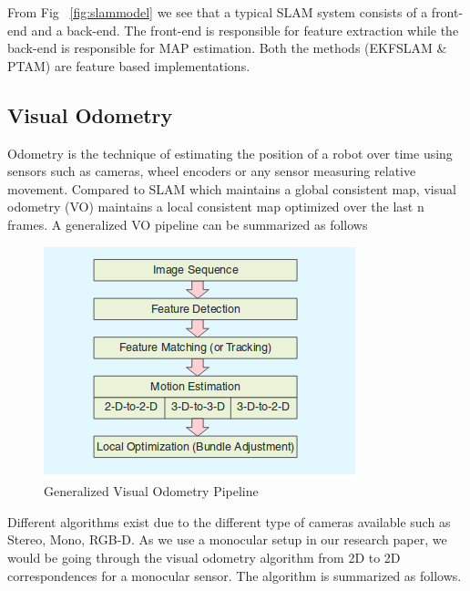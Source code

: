 From Fig ~\ref{fig:slammodel} we see that a typical SLAM system consists of a front-end and a back-end. The front-end is responsible for feature extraction while the back-end is responsible for MAP estimation. Both the methods (EKFSLAM \& PTAM) are feature based implementations. 

\subsection{Visual Odometry}

Odometry is the technique of estimating the position of a robot over time using sensors such as cameras,  wheel encoders or any sensor measuring relative movement. Compared to SLAM which maintains a global consistent map, visual odometry (VO) maintains a local consistent map optimized over the last n frames. A generalized VO pipeline can be summarized as follows

\begin{figure}[!htb]
  \includegraphics[width=\textwidth]{./figures/vo.png}
\caption{Generalized Visual Odometry Pipeline}
\label{fig:vo}       %
\end{figure}

Different algorithms exist due to the different type of cameras available such as Stereo, Mono, RGB-D. As we use a monocular setup in our research paper, we would be going through the visual odometry algorithm from 2D to 2D correspondences for a monocular sensor. The algorithm is summarized as follows.

